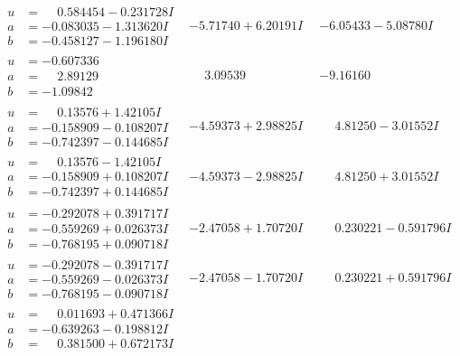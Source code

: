 \documentclass[1p]{elsarticle_modified}
\theoremstyle{definition}
\begin{document}
$$\begin{array}{c|c|c}
\begin{aligned}
u &= \phantom{-}0.584454 - 0.231728 I \\
a &= -0.083035 - 1.313620 I \\
b &= -0.458127 - 1.196180 I\end{aligned}
 & -5.71740 + 6.20191 I & -6.05433 - 5.08780 I \\ \hline\begin{aligned}
u &= -0.607336\phantom{ +0.000000I} \\
a &= \phantom{-}2.89129\phantom{ +0.000000I} \\
b &= -1.09842\phantom{ +0.000000I}\end{aligned}
 & \phantom{-}3.09539\phantom{ +0.000000I} & -9.16160\phantom{ +0.000000I} \\ \hline\begin{aligned}
u &= \phantom{-}0.13576 + 1.42105 I \\
a &= -0.158909 - 0.108207 I \\
b &= -0.742397 - 0.144685 I\end{aligned}
 & -4.59373 + 2.98825 I & \phantom{-}4.81250 - 3.01552 I \\ \hline\begin{aligned}
u &= \phantom{-}0.13576 - 1.42105 I \\
a &= -0.158909 + 0.108207 I \\
b &= -0.742397 + 0.144685 I\end{aligned}
 & -4.59373 - 2.98825 I & \phantom{-}4.81250 + 3.01552 I \\ \hline\begin{aligned}
u &= -0.292078 + 0.391717 I \\
a &= -0.559269 + 0.026373 I \\
b &= -0.768195 + 0.090718 I\end{aligned}
 & -2.47058 + 1.70720 I & \phantom{-}0.230221 - 0.591796 I \\ \hline\begin{aligned}
u &= -0.292078 - 0.391717 I \\
a &= -0.559269 - 0.026373 I \\
b &= -0.768195 - 0.090718 I\end{aligned}
 & -2.47058 - 1.70720 I & \phantom{-}0.230221 + 0.591796 I \\ \hline\begin{aligned}
u &= \phantom{-}0.011693 + 0.471366 I \\
a &= -0.639263 - 0.198812 I \\
b &= \phantom{-}0.381500 + 0.672173 I\end{aligned}

\end{array}$$
\end{document}
